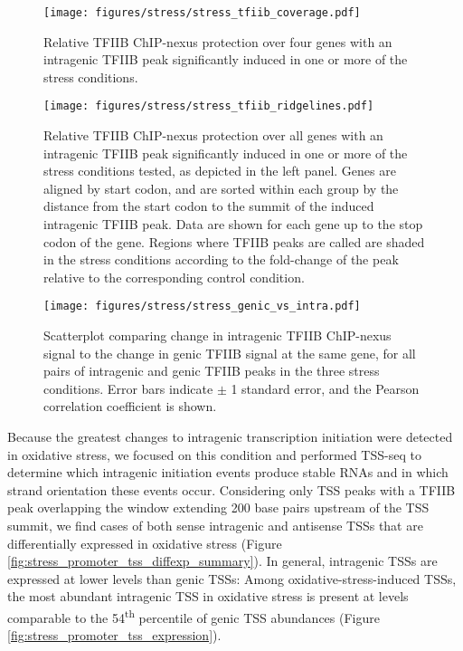 \begin{figure}[h]
    \texttt{[image: figures/stress/stress\_tfiib\_coverage.pdf]}
    \label{fig:stress_tfiib_coverage}
    \caption[TFIIB ChIP-nexus protection over four genes with stress-induced intragenic TFIIB peaks.]{Relative TFIIB ChIP-nexus protection over four genes with an intragenic TFIIB peak significantly induced in one or more of the stress conditions.}
\end{figure}

\begin{sidewaysfigure}
    \texttt{[image: figures/stress/stress\_tfiib\_ridgelines.pdf]}
    \caption[TFIIB ChIP-nexus protection over all genes with stress-induced intragenic TFIIB peaks.]{Relative TFIIB ChIP-nexus protection over all genes with an intragenic TFIIB peak significantly induced in one or more of the stress conditions tested, as depicted in the left panel. Genes are aligned by start codon, and are sorted within each group by the distance from the start codon to the summit of the induced intragenic TFIIB peak. Data are shown for each gene up to the stop codon of the gene. Regions where TFIIB peaks are called are shaded in the stress conditions according to the fold-change of the peak relative to the corresponding control condition.}
    \label{fig:stress_tfiib_ridgelines}
\end{sidewaysfigure}

\begin{figure}[h]
    \texttt{[image: figures/stress/stress\_genic\_vs\_intra.pdf]}
    \label{fig:stress_genic_vs_intra}
    \caption[Scatterplot of change in intragenic versus genic TFIIB ChIP-nexus signal, for all pairs of intragenic and genic TFIIB peaks in the three stress conditions.]{Scatterplot comparing change in intragenic TFIIB ChIP-nexus signal to the change in genic TFIIB signal at the same gene, for all pairs of intragenic and genic TFIIB peaks in the three stress conditions. Error bars indicate $\pm$ 1 standard error, and the Pearson correlation coefficient is shown.}
\end{figure}

Because the greatest changes to intragenic transcription initiation were detected in oxidative stress, we focused on this condition and performed TSS-seq to determine which intragenic initiation events produce stable RNAs and in which strand orientation these events occur.
Considering only TSS peaks with a TFIIB peak overlapping the window extending 200 base pairs upstream of the TSS summit, we find cases of both sense intragenic and antisense TSSs that are differentially expressed in oxidative stress (Figure \ref{fig:stress_promoter_tss_diffexp_summary}).
In general, intragenic TSSs are expressed at lower levels than genic TSSs: Among oxidative-stress-induced TSSs, the most abundant intragenic TSS in oxidative stress is present at levels comparable to the 54\textsuperscript{th} percentile of genic TSS abundances (Figure \ref{fig:stress_promoter_tss_expression}).

